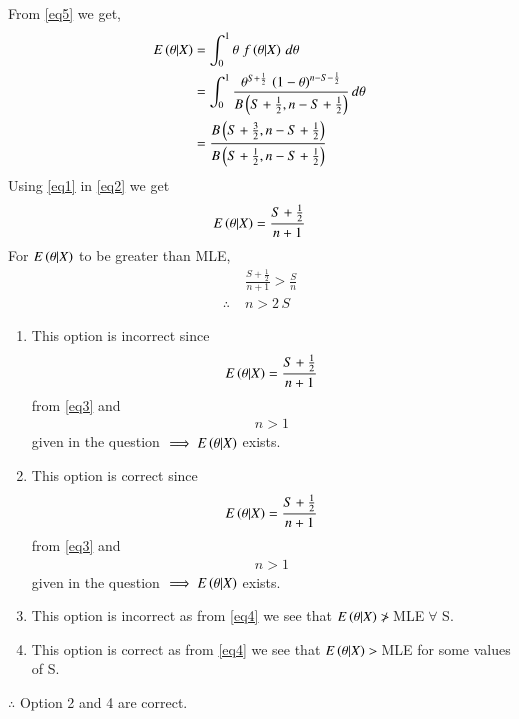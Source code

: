 \documentclass[journal,12pt,twocolumn]{IEEEtran}
\begin{document}
From \eqref{eq5} we get,
\begin{align}
    E\left(\theta|X\right) &= \int_0^1 \theta\;f\left(\theta|X\right)\,d\theta\nonumber\\
    &=\int_0^1 \frac{\theta^{S+\frac{1}{2}}\,\left(1-\theta\right)^{n-S-\frac{1}{2}}}{B\left(S+\frac{1}{2},n-S+\frac{1}{2}\right)}\,d\theta\nonumber\\
    &=\frac{B\left(S+\frac{3}{2},n-S+\frac{1}{2}\right)}{B\left(S+\frac{1}{2},n-S+\frac{1}{2}\right)}\label{eq2}
\end{align}
Using \eqref{eq1} in \eqref{eq2} we get
\begin{align}
    E\left(\theta|X\right) = \frac{S+\frac{1}{2}}{n+1}\label{eq3}
\end{align}
For $E\left(\theta|X\right)$ to be greater than MLE,
\begin{align}
    &\frac{S+\frac{1}{2}}{n+1} > \frac{S}{n}\nonumber\\
     \therefore\;&n>2\,S\label{eq4}
\end{align}
\begin{enumerate}
    \item This option is incorrect since 
    \begin{align*}
        E\left(\theta|X\right) = \frac{S+\frac{1}{2}}{n+1} 
    \end{align*}
       from \eqref{eq3} and
    \begin{align*}
        n>1 
    \end{align*}
    given in the question $\implies E\left(\theta|X\right)$ exists.
    \item This option is correct since 
    \begin{align*}
        E\left(\theta|X\right) = \frac{S+\frac{1}{2}}{n+1} 
    \end{align*}
       from \eqref{eq3} and
    \begin{align*}
        n>1 
    \end{align*}
    given in the question $\implies E\left(\theta|X\right)$ exists.
    \item This option is incorrect as from \eqref{eq4} we see that $E\left(\theta|X\right)\ngtr\, $MLE$\;\forall$ S.
    \item This option is correct as from \eqref{eq4} we see that $E\left(\theta|X\right)>\, $MLE for some values of S.
\end{enumerate}
$\therefore$ Option 2 and 4 are correct.
\end{document}
